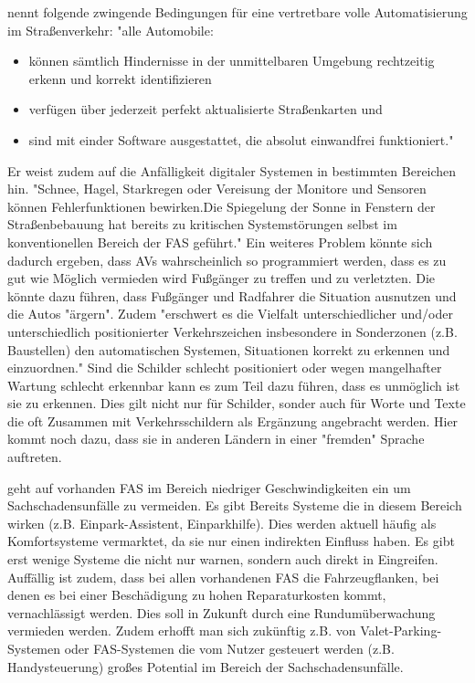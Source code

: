 \Textcite[S.639]{Kossak.2017} nennt folgende  zwingende Bedingungen für eine vertretbare volle Automatisierung im Straßenverkehr: "alle Automobile:
\begin{itemize}
	\item können sämtlich Hindernisse in der unmittelbaren Umgebung rechtzeitig erkenn und korrekt identifizieren
	\item verfügen über jederzeit perfekt aktualisierte  Straßenkarten und
	\item sind mit einder Software ausgestattet, die absolut einwandfrei funktioniert."
\end{itemize}
Er weist zudem auf die Anfälligkeit digitaler Systemen in bestimmten Bereichen hin. "Schnee, Hagel, Starkregen oder Vereisung der Monitore und Sensoren können Fehlerfunktionen bewirken.Die Spiegelung der Sonne in Fenstern der Straßenbebauung hat bereits zu kritischen Systemstörungen selbst im konventionellen Bereich der FAS geführt."
Ein weiteres Problem könnte sich dadurch ergeben, dass AVs wahrscheinlich so programmiert werden, dass es zu gut wie Möglich vermieden wird Fußgänger zu treffen und zu verletzten. Die könnte dazu führen, dass Fußgänger und Radfahrer die Situation ausnutzen und die Autos "ärgern".
Zudem "erschwert es die Vielfalt unterschiedlicher und/oder unterschiedlich positionierter Verkehrszeichen insbesondere in Sonderzonen (z.B. Baustellen) den automatischen Systemen, Situationen korrekt zu erkennen und einzuordnen." Sind die Schilder schlecht positioniert oder wegen mangelhafter Wartung schlecht erkennbar kann es zum Teil dazu führen, dass es unmöglich ist sie zu erkennen. Dies gilt nicht nur für Schilder, sonder auch für Worte und Texte die oft Zusammen mit Verkehrsschildern als Ergänzung angebracht werden. Hier kommt noch dazu, dass sie in anderen Ländern in einer "fremden" Sprache auftreten.

\Textcite[S.18-21]{Gschwendtner.2015} geht auf vorhanden FAS im Bereich niedriger Geschwindigkeiten ein um Sachschadensunfälle zu vermeiden. Es gibt Bereits Systeme die in diesem Bereich wirken (z.B. Einpark-Assistent, Einparkhilfe). Dies werden aktuell häufig als Komfortsysteme vermarktet, da sie nur einen indirekten Einfluss haben. Es gibt erst wenige Systeme die nicht nur warnen, sondern auch direkt in Eingreifen. Auffällig ist zudem, dass bei allen vorhandenen FAS die Fahrzeugflanken, bei denen es bei einer Beschädigung zu hohen Reparaturkosten kommt, vernachlässigt werden. Dies soll in Zukunft durch eine Rundumüberwachung vermieden werden. Zudem erhofft man sich zukünftig z.B. von Valet-Parking-Systemen oder FAS-Systemen die vom Nutzer gesteuert werden (z.B. Handysteuerung) großes Potential im Bereich der Sachschadensunfälle.

